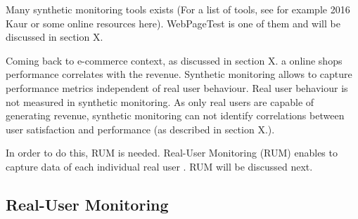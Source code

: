 Many synthetic monitoring tools exists (For a list of tools, see for example 2016 Kaur or some online resources here).
WebPageTest is one of them and will be discussed in section X.



Coming back to e-commerce context, as discussed in section X.  a online shops performance correlates with the revenue.
Synthetic monitoring allows to capture performance metrics independent of real user behaviour.
Real user behaviour is not measured in synthetic monitoring.
As only real users are capable of generating revenue, synthetic monitoring can not identify correlations between user satisfaction and performance (as described in section X.).%

In order to do this, RUM is needed.
Real-User Monitoring (RUM) enables to capture data of each individual real user .
RUM will be discussed next.


















\subsection{Real-User Monitoring}


